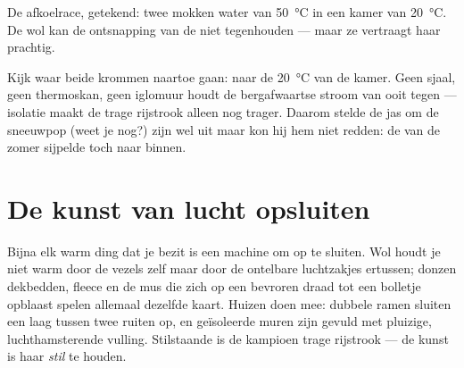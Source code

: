 \begin{omfigure}

{\small De afkoelrace, getekend: twee mokken water van
\qty{50}{\celsius} in een kamer van \qty{20}{\celsius}. De wol kan de
ontsnapping van de  niet tegenhouden --- maar ze vertraagt haar
prachtig.}
\end{omfigure}

\begin{remark}\label{rem:g5:heat-and-insulation:onlyslows}
Kijk waar beide krommen naartoe gaan: naar de \qty{20}{\celsius} van
de kamer. Geen sjaal, geen thermoskan, geen iglomuur houdt de
bergafwaartse stroom van  ooit tegen --- isolatie maakt de trage
rijstrook alleen nog trager. Daarom stelde de jas om de sneeuwpop (weet
je nog?) zijn  wel uit maar kon hij hem niet redden: de
 van de zomer sijpelde toch naar binnen.
\end{remark}

\section{De kunst van lucht opsluiten}

\begin{example}[Wintertechniek]\label{ex:g5:heat-and-insulation:air}
Bijna elk warm ding dat je bezit is een machine om  op te
sluiten. Wol houdt je niet warm door de vezels zelf maar door de
ontelbare luchtzakjes ertussen; donzen dekbedden, fleece en de mus die
zich op een bevroren draad tot een bolletje opblaast spelen allemaal
dezelfde kaart. Huizen doen mee: dubbele ramen sluiten een laag
 tussen twee ruiten op, en geïsoleerde muren zijn gevuld met
pluizige, luchthamsterende vulling. Stilstaande  is de kampioen
trage rijstrook --- de kunst is haar \emph{stil} te houden.
\end{example}

